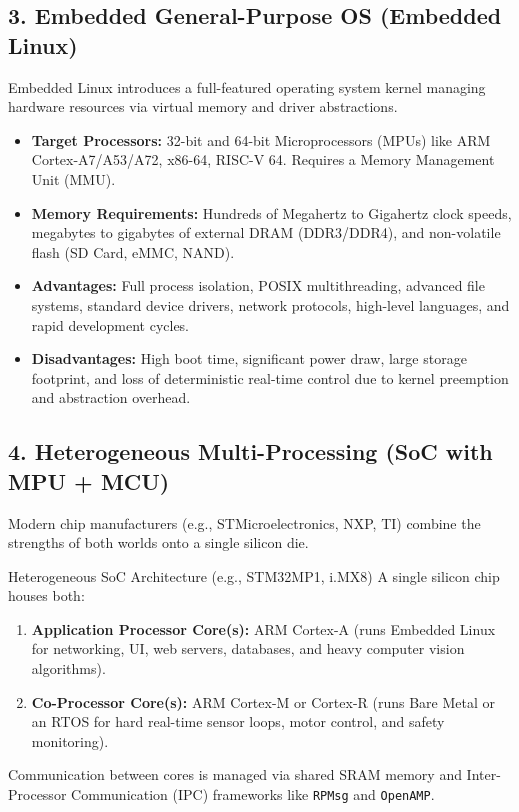 \subsection{3. Embedded General-Purpose OS (Embedded Linux)}
Embedded Linux introduces a full-featured operating system kernel managing hardware resources via virtual memory and driver abstractions.
\begin{itemize}[leftmargin=*]
    \item \textbf{Target Processors:} 32-bit and 64-bit Microprocessors (MPUs) like ARM Cortex-A7/A53/A72, x86-64, RISC-V 64. Requires a Memory Management Unit (MMU).
    \item \textbf{Memory Requirements:} Hundreds of Megahertz to Gigahertz clock speeds, megabytes to gigabytes of external DRAM (DDR3/DDR4), and non-volatile flash (SD Card, eMMC, NAND).
    \item \textbf{Advantages:} Full process isolation, POSIX multithreading, advanced file systems, standard device drivers, network protocols, high-level languages, and rapid development cycles.
    \item \textbf{Disadvantages:} High boot time, significant power draw, large storage footprint, and loss of deterministic real-time control due to kernel preemption and abstraction overhead.
\end{itemize}

\subsection{4. Heterogeneous Multi-Processing (SoC with MPU + MCU)}
Modern chip manufacturers (e.g., STMicroelectronics, NXP, TI) combine the strengths of both worlds onto a single silicon die.
\begin{conceptbox}{Heterogeneous SoC Architecture (e.g., STM32MP1, i.MX8)}
A single silicon chip houses both:
\begin{enumerate}[leftmargin=*]
    \item \textbf{Application Processor Core(s):} ARM Cortex-A (runs Embedded Linux for networking, UI, web servers, databases, and heavy computer vision algorithms).
    \item \textbf{Co-Processor Core(s):} ARM Cortex-M or Cortex-R (runs Bare Metal or an RTOS for hard real-time sensor loops, motor control, and safety monitoring).
\end{enumerate}
Communication between cores is managed via shared SRAM memory and Inter-Processor Communication (IPC) frameworks like \texttt{RPMsg} and \texttt{OpenAMP}.
\end{conceptbox}


